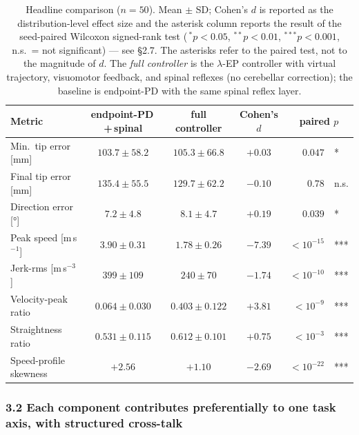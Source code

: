 \documentclass[
  11pt,
]{article}
\begin{document}
\begin{table}[ht]
\centering
\caption{Headline comparison ($n = 50$).  Mean $\pm$ SD; Cohen's $d$
is reported as the distribution-level effect size and the asterisk
column reports the result of the seed-paired Wilcoxon signed-rank
test (\,$^{*}p<0.05$, $^{**}p<0.01$, $^{***}p<0.001$, n.s.\ = not
significant) — see \S2.7.  The asterisks refer to the paired test,
not to the magnitude of $d$.  The \emph{full controller} is the
$\lambda$-EP controller with virtual trajectory, visuomotor
feedback, and spinal reflexes (no cerebellar correction); the
baseline is endpoint-PD with the same spinal reflex layer.}
\label{tab:headline}
\setlength{\tabcolsep}{5pt}
\renewcommand{\arraystretch}{1.15}
\begin{tabular}{@{}lcccr@{\,}l@{}}
\hline
Metric & endpoint-PD\,+\,spinal & full controller & Cohen's $d$ & \multicolumn{2}{c}{paired $p$} \\
\hline
Min.~tip error [mm]            & $103.7 \pm 58.2$  & $105.3 \pm 66.8$           & $+0.03$ & $0.047$  & * \\
Final tip error [mm]           & $135.4 \pm 55.5$  & $129.7 \pm 62.2$           & $-0.10$ & $0.78$   & n.s. \\
Direction error [°]            & $7.2 \pm 4.8$     & $8.1 \pm 4.7$              & $+0.19$ & $0.039$  & * \\
Peak speed [m\,s$^{-1}$]       & $3.90 \pm 0.31$   & $1.78 \pm 0.26$            & $-7.39$ & $<10^{-15}$ & *** \\
Jerk-rms [m\,s$^{-3}$]         & $399 \pm 109$     & $240 \pm 70$               & $-1.74$ & $<10^{-10}$ & *** \\
Velocity-peak ratio            & $0.064 \pm 0.030$ & $\mathbf{0.403 \pm 0.122}$ & $+3.81$ & $<10^{-9}$ & *** \\
Straightness ratio             & $0.531 \pm 0.115$ & $0.612 \pm 0.101$          & $+0.75$ & $<10^{-3}$ & *** \\
Speed-profile skewness         & $+2.56$           & $+1.10$                    & $-2.69$ & $<10^{-22}$ & *** \\
\hline
\end{tabular}
\end{table}

\hypertarget{each-component-contributes-preferentially-to-one-task-axis-with-structured-cross-talk}{%
\subsubsection{3.2 Each component contributes preferentially to one task
axis, with structured
cross-talk}\label{each-component-contributes-preferentially-to-one-task-axis-with-structured-cross-talk}}
\end{document}

